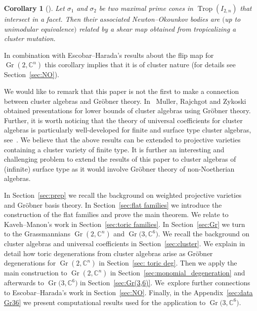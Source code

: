 \documentclass[pdftex]{sigma}%
\newtheorem{Corollary}[Theorem]{Corollary}
\numberwithin{equation}{section}
\DeclareMathOperator{\Gr}{Gr}
\DeclareMathOperator{\trop}{Trop}
\begin{document}
\begin{Corollary}[]
Let $\sigma_1$ and $\sigma_2$ be two maximal prime cones in $\trop(I_{2,n})$ that intersect in a facet. Then their associated Newton--Okounkov bodies
are $($up to unimodular equivalence$)$ related by a shear map obtained from tropicalizing a cluster mutation.
\end{Corollary}

In combination with Escobar--Harada's results about the flip map for $\Gr(2,\mathbb C^n)$ this corollary implies that it is of cluster nature (for details see Section~\ref{sec:NO}).

We would like to remark that this paper is not the first to make a connection between cluster algebras and Gr\"obner theory.
In~\cite{MRZ18} Muller, Rajchgot and Zykoski obtained presentations for lower bounds of cluster algebras using Gr\"obner theory.
Further, it is worth noticing that the theory of universal coefficients for cluster algebras is particularly well-developed for finite and surface type cluster algebras, see~\cite{Rea_surface}.
We believe that the above results can be extended to projective varieties containing a cluster variety of finite type.
It is further an interesting and challenging problem to extend the results of this paper to cluster algebras of (infinite) surface type as it would involve Gr\"obner theory of non-Noetherian algebras.

\medskip

 In Section~\ref{sec:prep} we recall the background on weighted projective varieties and Gr\"obner basis theory.
In Section~\ref{sec:flat families} we introduce the construction of the flat families and prove the main theorem.
We relate to Kaveh--Manon's work in Section~\ref{sec:toric families}.
In Section~\ref{sec:Gr} we turn to the Grassmannians $\Gr(2,\mathbb C^n)$ and $\Gr\big(3,\mathbb C^6\big)$.
We recall the background on cluster algebras and universal coefficients in Section~\ref{sec:cluster}.
We explain in detail how toric degenerations from cluster algebras arise as Gr\"obner degenerations for $\Gr(2,\mathbb C^n)$ in Section~\ref{sec: toric deg}.
Then we apply the main construction to $\Gr(2,\mathbb C^n)$ in Section~\ref{sec:monomial_degeneration} and afterwards to $\Gr\big(3,\mathbb C^6\big)$ in Section~\ref{sec:Gr(3,6)}.
We~explore further connections to Escobar--Harada's work in Section~\ref{sec:NO}.
Finally, in the Appendix~\ref{sec:data Gr36} we present computational results used for the application to $\Gr\big(3,\mathbb C^6\big)$.
\end{document}
